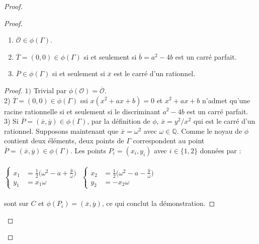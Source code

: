 \documentclass[a4paper]{article}
\begin{document}
\begin{proof}
\begin{proof}
\begin{slem} \label{prop2}
\begin{enumerate}
\item $\overline{\mathcal{O}} \in \phi(\Gamma)$.
\item $ \overline{T}=(0,0) \in \phi(\Gamma)$ si et seulement si $\overline{b}=a^2-4b$ est un carré parfait.
\item $\overline{P} \in \phi(\Gamma)$ si et seulement si $\overline{x}$ est le carré d'un rationnel.
\end{enumerate}
\end{slem}

\begin{proof}
$1)$ Trivial par $\phi(\mathcal{O})=\overline{\mathcal{O}}$. \\
2)  $\overline{T}=(0,0) \in \phi(\Gamma)$ ssi $x(x^2+ax+b)=0$ et $x^2+ax+b$ n'admet qu'une racine rationnelle si et seulement si le discriminant $a^2-4b$ est un carré parfait. \\
3) Si $\overline{P}=(\overline{x},\overline{y}) \in \phi(\Gamma)$, par la définition de $\phi$, $\overline{x}=y^2/x^2$ qui est le carré d'un rationnel.
Supposons maintenant que $\overline{x}=\omega^2$ avec $\omega \in \mathbb{Q}$.
Comme le noyau de $\phi$ contient deux éléments, deux points de $\Gamma$ correspondent au point $\overline{P}=(\overline{x},\overline{y}) \in \phi(\Gamma)$. Les points $P_{i}=(x_{i},y_{i})$ avec $i \in \{1,2\}$ données par : \\ \\
$\left\{
\begin{array}{rl}
 x_{1}&=\frac{1}{2}\Big(\omega^2-a+\frac{\overline{y}}{\omega}\Big) \\
y_{1}&= x_{1}\omega
\end{array}
\right.$
\hspace{1.5cm}
$\left\{
\begin{array}{rl}
x_{2}&=\frac{1}{2}\Big(\omega^2-a-\frac{\overline{y}}{\omega}\Big) \\
y_{2}&=-x_{2}\omega
\end{array}
\right.$ \\ \\
sont sur $C$ et $\phi(P_{i})=(\overline{x},\overline{y})$, ce qui conclut la démonstration. 
\end{proof}


\end{proof}
\end{proof}
\end{document}
